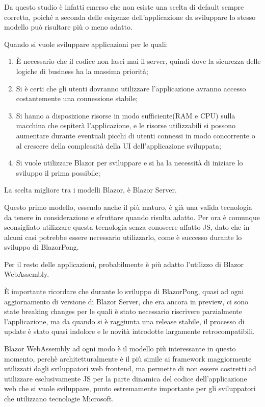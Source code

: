 Da questo studio \`e infatti emerso che non esiste una scelta di default sempre corretta, poich\'e a seconda delle esigenze dell'applicazione da sviluppare lo stesso modello pu\`o risultare pi\`u o meno adatto.

Quando si vuole sviluppare applicazioni per le quali:
\begin{enumerate}
	\item \`E necessario che il codice non lasci mai il server, quindi dove la sicurezza delle logiche di business ha la massima priorit\`a;
	\item Si \`e certi che gli utenti dovranno utilizzare l'applicazione avranno accesso costantemente una connessione stabile;
	\item Si hanno a disposizione risorse in modo sufficiente(RAM e CPU) sulla macchina che ospiter\`a l'applicazione, e le risorse utilizzabili si possono aumentare durante eventuali picchi di utenti connessi in modo concorrente o al crescere della complessit\`a della UI dell'applicazione sviluppata;
	\item Si vuole utilizzare Blazor per sviluppare e si ha la necessit\`a di iniziare lo sviluppo il prima possibile;
\end{enumerate}

La scelta migliore tra i modelli Blazor, \`e Blazor Server.

Questo primo modello, essendo anche il pi\`u maturo, \`e gi\`a una valida tecnologia da tenere in considerazione e sfruttare quando risulta adatto.
Per ora \`e comunque sconsigliato utilizzare questa tecnologia senza conoscere affatto JS, dato che in alcuni casi potrebbe essere necessario utilizzarlo, come \`e successo durante lo sviluppo di BlazorPong.

Per il resto delle applicazioni, probabilmente \`e pi\`u adatto l'utilizzo di Blazor WebAssembly.

\`E importante ricordare che durante lo sviluppo di BlazorPong, quasi ad ogni aggiornamento di versione di Blazor Server, che era ancora in preview, ci sono state breaking changes per le quali \`e stato necessario riscrivere parzialmente l'applicazione, ma da quando si \`e raggiunta una release stabile, il processo di update \`e stato quasi indolore e le novit\`a introdotte largamente retrocompatibili.

Blazor WebAssembly ad ogni modo \`e il modello pi\`u interessante in questo momento, perch\`e architetturalmente \`e il pi\`u simile ai framework maggiormente utilizzati dagli sviluppatori web frontend, ma permette di non essere costretti ad utilizzare esclusivamente JS per la parte dinamica del codice dell'applicazione web che si vuole sviluppare, punto estremamente importante per gli sviluppatori che utilizzano tecnologie Microsoft.

